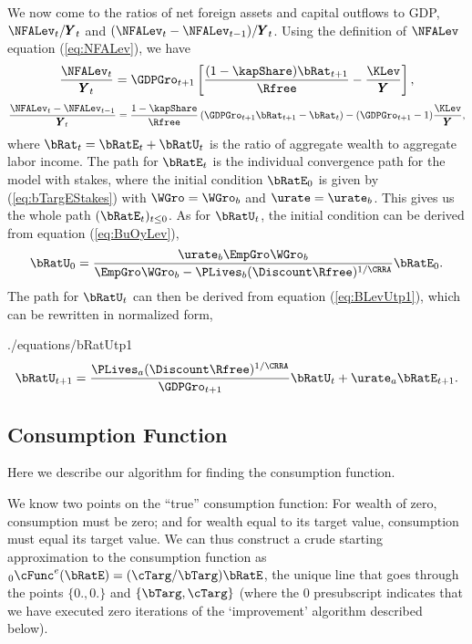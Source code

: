 \documentclass[titlepage]{\econtex}\newcommand{\texname}{cjSOE}
\renewcommand{\GDPLev}{\ensuremath{\pmb{Y}}}
\begin{document}
We now come to the ratios of net foreign assets and capital outflows to GDP, $\NFALev_t/\GDPLev_t$ and $(\NFALev_t -\NFALev_{t-1})/\GDPLev_t$. Using the definition of $\NFALev$ equation (\ref{eq:NFALev}), we have
\begin{equation*}
\frac{\NFALev_t}{\GDPLev_t}=\GDPGro_{t+1} \left[ \frac{(1-\kapShare) \bRat_{t+1}}{\Rfree} -\frac{\KLev}{\GDPLev} \right],
\end{equation*}
\begin{equation*}
\frac{\NFALev_t -\NFALev_{t-1}}{\GDPLev_t}=\frac{1-\kapShare}{\Rfree} \left( \GDPGro_{t+1} \bRat_{t+1} -\bRat_t \right) -(\GDPGro_{t+1}-1)\frac{\KLev}{\GDPLev},
\end{equation*}
where $\bRat_t=\bRatE_t+\bRatU_t$ is the ratio of aggregate wealth to aggregate labor income. The path for $\bRatE_t$ is the individual convergence path for the model with stakes, where the initial condition $\bRatE_0$ is given by (\ref{eq:bTargEStakes}) with $\WGro = \WGro_b$ and $\urate = \urate_b$. This gives us the whole path $(\bRatE_t)_{t \leq 0}$.
As for $\bRatU_t$, the initial condition can be derived from equation (\ref{eq:BuOyLev}),
\begin{equation*}
\bRatU_0= \frac{\urate_b \EmpGro \WGro_b}{\EmpGro \WGro_b -\PLives_b(\Discount \Rfree )^{1/\CRRA}} \bRatE_0.
\end{equation*}
The path for $\bRatU_t$ can then be derived from equation
(\ref{eq:BLevUtp1}), which can be rewritten in normalized form,
\begin{verbatimwrite}{./equations/bRatUtp1}
\begin{equation*}
\bRatU_{t+1}=\frac{\PLives_a(\Discount \Rfree)^{1/\CRRA}}{\GDPGro_{t+1}} \bRatU_t + \urate_a \bRatE_{t+1}.
\end{equation*}
\end{verbatimwrite}


\subsection{Consumption Function}

Here we describe our algorithm for finding the consumption
function.

We know two points on the ``true'' consumption function: For wealth of
zero, consumption must be zero; and for wealth equal to its target value,
consumption must equal its target value.  We can thus construct a crude starting approximation
to the consumption function as $_0\cFunc^{e}(\bRatE) = (\cTarg/\bTarg)\bRatE$,
the unique line that goes through the points $\{0.,0.\}$ and $\{\bTarg,\cTarg\}$ (where
the 0 presubscript indicates that we have executed zero iterations of the `improvement' algorithm
described below).
\end{document}
